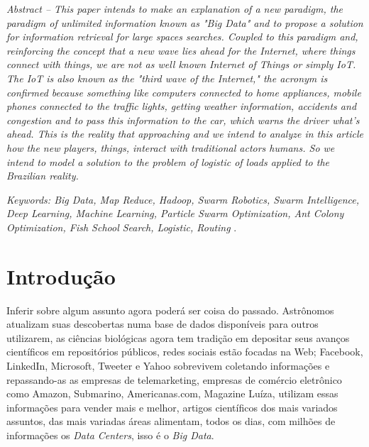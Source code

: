\documentclass[conference,compsoc]{IEEEtran}
\begin{document}
\vspace{0.1cm}

\textit{Abstract -- This paper intends to make an explanation of a new paradigm, the paradigm of unlimited information known as "Big Data" and to propose a solution for information retrieval for large spaces searches. Coupled to this paradigm and, reinforcing the concept that a new wave lies ahead for the Internet, where things connect with things, we are not as well known Internet of Things   or simply IoT. The IoT is also known as the "third wave of the Internet," the acronym is confirmed because something like computers connected to home appliances, mobile phones connected to the traffic lights, getting weather information, accidents and congestion and to pass this information to the car, which warns the driver what's ahead. This is the reality that approaching and we intend to analyze in this article how the new players, things, interact with traditional actors humans.
So we intend to model a solution to the problem of logistic of loads applied to the Brazilian reality.
}

\textit{Keywords: Big Data, Map Reduce, Hadoop, Swarm Robotics, Swarm Intelligence, Deep Learning, Machine Learning, Particle Swarm Optimization, Ant Colony Optimization, Fish School Search, Logistic, Routing
}.



%
\IEEEpeerreviewmaketitle



\section{Introdução}

Inferir sobre algum assunto agora poderá ser coisa do passado. Astrônomos atualizam suas descobertas numa base de 
dados disponíveis para outros utilizarem, as ciências biológicas agora tem tradição em depositar seus avanços 
científicos em repositórios públicos, redes sociais estão focadas na Web; Facebook, 
LinkedIn, Microsoft, Tweeter e Yahoo sobrevivem coletando informações e repassando-as as empresas de telemarketing, 
empresas de comércio eletrônico como Amazon, Submarino, Americanas.com, Magazine Luíza, utilizam essas informações 
para vender mais e melhor, artigos científicos dos mais variados assuntos, das mais variadas áreas alimentam, 
todos os dias,  com milhões de informações os \textit{Data Centers}, isso é o \textit{Big Data}.
\end{document}

